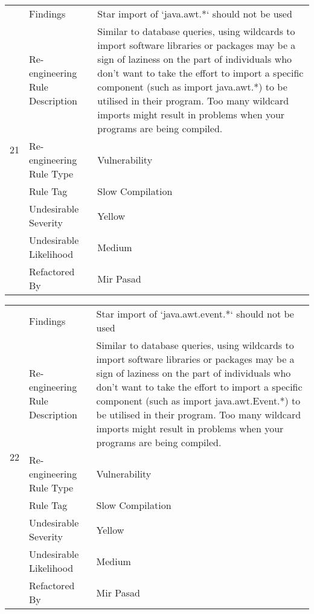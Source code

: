 \documentclass[12pt,english]{article}
\begin{document}
\begin{table}[!ht]
    \begin{tabularx}{\textwidth}{|c|l|X|}
    \hline
        \multirow{7}{*}{21} & Findings & Star import of ‘java.awt.*‘ should not be used \\ \cline{2-3}
        & Re-engineering Rule Description & Similar to database queries, using wildcards to import software libraries or packages may be a sign of laziness on the part of individuals who don't want to take the effort to import a specific component (such as import java.awt.*) to be utilised in their program.  Too many wildcard imports might result in problems when your programs are being compiled.
 \\ \cline{2-3}
        & Re-engineering Rule Type & Vulnerability \\ \cline{2-3}
        & Rule Tag & Slow Compilation \\ \cline{2-3}
        & Undesirable Severity & Yellow \\ \cline{2-3}
        & Undesirable Likelihood & Medium \\ \cline{2-3}
        & Refactored By & Mir Pasad \\ \hline
    \end{tabularx}
\end{table}

\begin{table}[!ht]
    \begin{tabularx}{\textwidth}{|c|l|X|}
    \hline
        \multirow{7}{*}{22} & Findings & Star import of ‘java.awt.event.*‘ should not be used \\ \cline{2-3}
        & Re-engineering Rule Description & Similar to database queries, using wildcards to import software libraries or packages may be a sign of laziness on the part of individuals who don't want to take the effort to import a specific component (such as import java.awt.Event.*) to be utilised in their program.  Too many wildcard imports might result in problems when your programs are being compiled.
 \\ \cline{2-3}
        & Re-engineering Rule Type & Vulnerability \\ \cline{2-3}
        & Rule Tag & Slow Compilation \\ \cline{2-3}
        & Undesirable Severity & Yellow \\ \cline{2-3}
        & Undesirable Likelihood & Medium \\ \cline{2-3}
        & Refactored By & Mir Pasad \\ \hline
    \end{tabularx}
\end{table}
\end{document}

